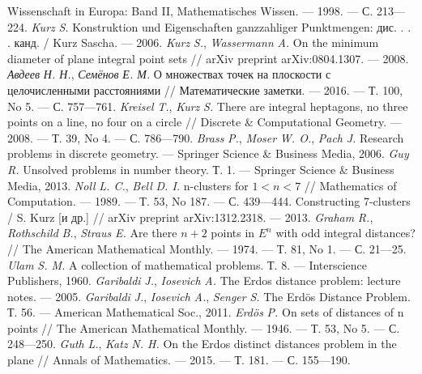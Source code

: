 \begin{thebibliography}{99}
Wissenschaft in Europa: Band II, Mathematisches Wissen. —
1998. — С. 213—224.
\textsl{Kurz} \textsl{S.} Konstruktion und Eigenschaften
ganzzahliger Punktmengen: дис. . . . канд. / Kurz Sascha. — 2006.
\textsl{Kurz} \textsl{S.}, \textsl{Wassermann} \textsl{A.} On
the minimum diameter of plane integral point sets /\!/ arXiv
preprint arXiv:0804.1307. — 2008.
\textsl{Авдеев} \textsl{Н. Н.}, \textsl{Семёнов} \textsl{Е. М.}
О множествах точек на плоскости с целочисленными
расстояниями /\!/ Математические заметки. — 2016. — Т. 100,
No 5. — С. 757—761.
\textsl{Kreisel} \textsl{T.}, \textsl{Kurz} \textsl{S.} There are
integral heptagons, no three points on a line, no four on a circle /\!/
Discrete \& Computational Geometry. — 2008. — Т. 39, No 4. —
С. 786—790.
\textsl{Brass} \textsl{P.}, \textsl{Moser} \textsl{W. O.},
\textsl{Pach} \textsl{J.} Research problems in discrete
geometry. — Springer Science \& Business Media, 2006.
\textsl{Guy} \textsl{R.} Unsolved problems in number theory. Т.
1. — Springer Science \& Business Media, 2013.
\textsl{Noll} \textsl{L. C.}, \textsl{Bell} \textsl{D. I.} n-clusters
for $1 < n < 7$ /\!/ Mathematics of Computation. — 1989. — Т. 53,
No 187. — С. 439—444.
Constructing 7-clusters / S. Kurz [и др.] /\!/ arXiv preprint
arXiv:1312.2318. — 2013.
\textsl{Graham} \textsl{R.}, \textsl{Rothschild} \textsl{B.},
\textsl{Straus} \textsl{E.} Are there $n + 2$ points in $E^n$ with odd
integral distances? /\!/ The American Mathematical Monthly. —
1974. — Т. 81, No 1. — С. 21—25.
\textsl{Ulam} \textsl{S. M.} A collection of mathematical
problems. Т. 8. — Interscience Publishers, 1960.
\textsl{Garibaldi} \textsl{J.}, \textsl{Iosevich} \textsl{A.} The
Erdos distance problem: lecture notes. — 2005.
\textsl{Garibaldi} \textsl{J.}, \textsl{Iosevich} \textsl{A.},
\textsl{Senger} \textsl{S.} The Erdös Distance Problem. Т. 56. —
American Mathematical Soc., 2011.
\textsl{Erdös} \textsl{P.} On sets of distances of n points /\!/
The American Mathematical Monthly. — 1946. — Т. 53, No 5. —
С. 248—250.
\textsl{Guth} \textsl{L.}, \textsl{Katz} \textsl{N. H.} On the
Erdos distinct distances problem in the plane /\!/ Annals of
Mathematics. — 2015. — Т. 181. — С. 155—190.
\end{thebibliography}
